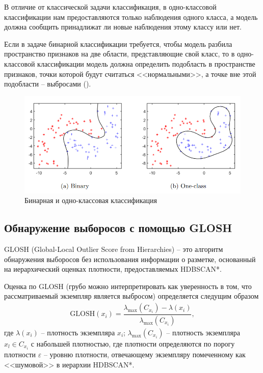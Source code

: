 \documentclass[%
	11pt,
	a4paper,
	utf8,
		]{article}
\begin{document}
В отличие от классической задачи классификация, в одно-классовой классификации нам предоставляются только наблюдения одного класса, а модель должна сообщить принадлижат ли новые наблюдения этому классу или нет.

Если в задаче бинарной классификации требуется, чтобы модель разбила пространство признаков на две области, представляющие свой класс, то в одно-классовой классификации модель должна определить подобласть в пространстве признаков, точки которой будут считаться <<нормальными>>, а точке вне этой подобласти -- выбросами ().

\begin{figure}[!h]
	\centering
	\includegraphics[scale=1.]{figures/binary_and_oneclass_classifiers.png}
	\caption{ Бинарная и одно-классовая классификация }\label{fig:binary_and_oneclass}
\end{figure}

\subsection{Обнаружение выборосов с помощью GLOSH}

GLOSH (Global-Local Outlier Score from Hierarchies) -- это алгоритм обнаружения выборосов без использования информации о разметке, основанный на иерархический оценках плотности, предоставляемых HDBSCAN*.

Оценка по GLOSH (грубо можно интерпретировать как уверенность в том, что рассматриваемый экземпляр является выбросом) определяется следущим образом
\begin{align*}
	\text{GLOSH}(x_i) = \dfrac{ \lambda_{\max} (C_{x_i}) - \lambda(x_i) }{ \lambda_{\max}(C_{x_i}) },
\end{align*} 
где $ \lambda(x_i) $ -- плотность экземпляра $ x_i $; $ \lambda_{\max}(C_{x_i}) $ -- плотность экземпляра $ x_l \in C_{x_i} $ с набольшей плотностью, где плотности определяются по порогу плотности $ \varepsilon $ -- уровню плотности, отвечающему экземпляру помеченному как <<шумовой>> в иерархии HDBSCAN*.
\end{document}
